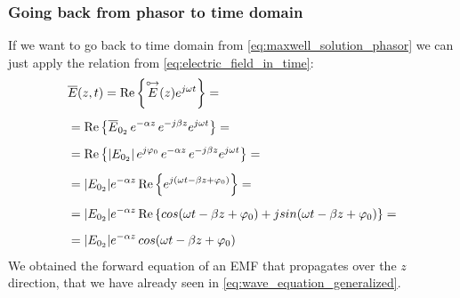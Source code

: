 \subsubsection*{Going back from phasor to time domain}
If we want to go back to time domain from \cref{eq:maxwell_solution_phasor} we can just apply the relation from \cref{eq:electric_field_in_time}:
\begin{align}
    \begin{split}
        &\overline{E}(z,t)=\operatorname{Re}\left\{\overset{\mathbin {{\circ \mkern-2.5mu\rightarrow}}}{E}(z)e^{j\omega t}\right\}=\\[5pt]
        &=\operatorname{Re}\left\{\overline{E}_{0_2}\,e^{-\alpha z}\,e^{-j\beta z}e^{j\omega t}\right\} =\\[5pt]
        &=\operatorname{Re}\left\{|E_{0_2}|\,e^{j\varphi_0}\,e^{-\alpha z}\,e^{-j\beta z}e^{j\omega t}\right\} =\\[5pt]
        &= |E_{0_2}| e^{-\alpha z}\operatorname{Re}\left\{e^{j(\omega t-\beta z +\varphi_0)}\right\}=\\[5pt]
        &= |E_{0_2}| e^{-\alpha z}\operatorname{Re}\left\{cos(\omega t-\beta z +\varphi_0)+j sin(\omega t-\beta z +\varphi_0)\right\}=\\[5pt]
        &= |E_{0_2}| e^{-\alpha z}\,cos(\omega t-\beta z +\varphi_0)
    \end{split}
\end{align}
We obtained the forward equation of an EMF that propagates over the $z$ direction, that we have already seen in \cref{eq:wave_equation_generalized}.
